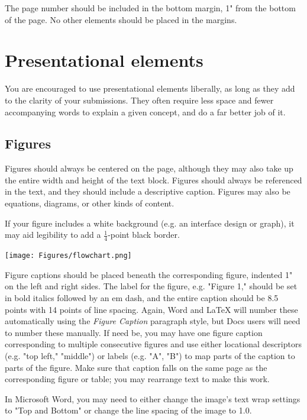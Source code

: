 \documentclass[
	letterpaper, %
]{jdf}
\begin{document}
The page number should be included in the bottom margin, 1" from the bottom of the page. No other elements should be placed in the margins.

\section{Presentational elements}
You are encouraged to use presentational elements liberally, as long as they add to the clarity of your submissions. They often require less space and fewer accompanying words to explain a given concept, and do a far better job of it.

\subsection{Figures}
Figures should always be centered on the page, although they may also take up the entire width and height of the text block. Figures should always be referenced in the text, and they should include a descriptive caption. Figures may also be equations, diagrams, or other kinds of content.

If your figure includes a white background (e.g. an interface design or graph), it may aid legibility to add a \(\frac{1}{4}\)-point black border.

\begin{jdffigure}
\texttt{[image: Figures/flowchart.png]}%
\label{fig:flowchart}%
\end{jdffigure}

Figure captions should be placed beneath the corresponding figure, indented 1" on the left and right sides. The label for the figure, e.g. "Figure 1," should be set in bold italics followed by an em dash, and the entire caption should be 8.5 points with 14 points of line spacing. Again, Word and LaTeX will number these automatically using the \emph{Figure Caption} paragraph style, but Docs users will need to number these manually. If need be, you may have one figure caption corresponding to multiple consecutive figures and use either locational descriptors (e.g. "top left," "middle") or labels (e.g. "A", "B") to map parts of the caption to parts of the figure. Make sure that caption falls on the same page as the corresponding figure or table; you may rearrange text to make this work.

In Microsoft Word, you may need to either change the image’s text wrap settings to "Top and Bottom" or change the line spacing of the image to 1.0.
\end{document}
